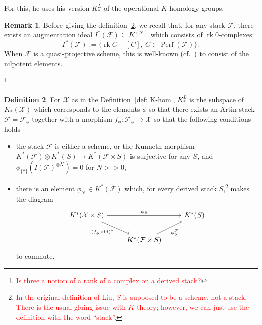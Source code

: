 \documentclass[12pt]{amsart}
\theoremstyle{definition}
\newtheorem{definition}{Definition}[section]
\newtheorem{remark}[definition]{Remark}
\newcommand{\1}{\mathbf 1}
\begin{document}
For this, he uses his version $K_*^L$ of the operational $K$-homology groups. 

\begin{remark}\label{rem: nilp} Before giving the definition~\ref{def: fin-K-hom}, we recall that, for any stack $\mathcal F$, there exists an augmentation ideal $I^*(\mathcal F) \subseteq K^(\mathcal F)$ which consists of $\operatorname{rk} 0$-complexes:
$$I^*(\mathcal F):=\{\operatorname{rk} C - [C], \ C \in \operatorname{Perf}(\mathcal F)\}.$$
When $\mathcal F$ is a quasi-projective scheme, this is well-known (cf.~\cite[Lemma 2.2.1]{Liu}) to consist of the nilpotent elements.

\footnote{\textcolor{red}{Is three a notion of a rank of a complex on a derived stack?}}
\end{remark}

\begin{definition}\label{def: fin-K-hom}
For $\mathcal X$ as in the Definition~\ref{def: K-hom}, $K_*^L$ is the subspace of $K_*(\mathcal X)$ which corresponds to the elements $\phi$ so that there exists an Artin stack $\mathcal F = \mathcal F_{\phi}$ together with a morphism $f_{\phi}: \mathcal F_{\phi} \to \mathcal X$ so that the following conditions holds 
\begin{itemize} 
\item the stack $\mathcal F$ is either a scheme, or the Kunneth morphism $K^*(\mathcal F) \otimes K^*(S) \to K^*(\mathcal F \times S)$ is surjective for any $S$, and $\phi_{\{*\}}(I(\mathcal F)^{\otimes N}) = 0$ for $N >> 0$,
\item there is an element $\phi_{\mathcal F} \in K^*(\mathcal F)$ which, for every  derived stack $S$,\footnote{\textcolor{red}{In the original definition of Liu, $S$ is supposed to be a scheme, not a stack. There is the usual gluing issue with $K$-theory; however, we can just use the definition with the word ``stack''.}}  makes the diagram
\[\begin{tikzcd}
	{K^*(\mathcal X \times S)} && {K^*(S)} \\
	& {K^*(\mathcal F \times S)}
	\arrow["{\phi_S}", from=1-1, to=1-3]
	\arrow["{(f_{\phi} \times \operatorname{id})^*}"', from=1-1, to=2-2]
	\arrow["{\phi_S^{\mathcal F}}"', from=2-2, to=1-3]
\end{tikzcd}\]
to commute.
\end{itemize}
\end{definition}
\end{document}
